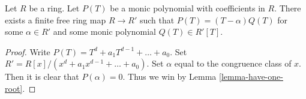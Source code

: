 \begin{lemma}
\label{lemma-adjoin-one-root}
Let $R$ be a ring. Let $P(T)$ be a monic polynomial with coefficients
in $R$. There exists a finite free ring map $R \to R'$ such that
$P(T) = (T - \alpha)Q(T)$ for some $\alpha \in R'$ and some
monic polynomial $Q(T) \in R'[T]$.
\end{lemma}

\begin{proof}
Write $P(T) = T^d + a_1T^{d - 1} + \ldots + a_0$.
Set $R' = R[x]/(x^d + a_1x^{d - 1} + \ldots + a_0)$.
Set $\alpha$ equal to the congruence class of $x$.
Then it is clear that $P(\alpha) = 0$. Thus we win by
Lemma \ref{lemma-have-one-root}.
\end{proof}
